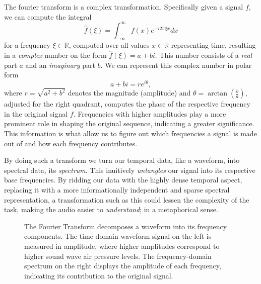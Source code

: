 The fourier transform is a complex transformation. Specifically given a signal $f$, we can compute the integral \[ \widehat{f}(\xi) = \int^{\infty}_{-\infty}{f(x)e^{-i2\pi \xi x} dx} \] for a frequency $\xi \in \mathbb{R}$, computed over all values $x \in \mathbb{R}$ representing time, resulting in a \textit{complex} number on the form $\widehat{f}(\xi) = a + bi$. This number consists of a \textit{real} part $a$ and an \textit{imaginary} part $b$. We can represent this complex number in polar form \[ a + bi = re^{i\theta}, \] where $r = \sqrt{a^2 + b^2}$ denotes the magnitude (amplitude) and $\theta = \arctan{(\frac{b}{a})}$, adjusted for the right quadrant, computes the phase of the respective frequency in the original signal $f$. Frequencies with higher amplitudes play a more prominent role in shaping the original sequence, indicating a greater significance. This information is what allow us to figure out which frequencies a signal is made out of and how each frequency contributes. 

By doing such a transform we turn our temporal data, like a waveform, into spectral data, its \textit{spectrum}. This inuitively \textit{untangles} our signal into its respective base frequencies. By ridding our data with the highly dense temporal aspect, replacing it with a more informationally independent and sparse spectral representation, a transformation such as this could lessen the complexity of the task, making the audio easier to \textit{understand}; in a metaphorical sense.

\begin{figure}[H]
    \centering
    \hspace*{-1.3cm}
    \caption{The Fourier Transform decomposes a waveform into its frequency components. The time-domain waveform signal on the left is measured in amplitude, where higher amplitudes correspond to higher sound wave air pressure levels. The frequency-domain spectrum on the right displays the amplitude of each frequency, indicating its contribution to the original signal.}
    \label{FTFigure}
\end{figure}

